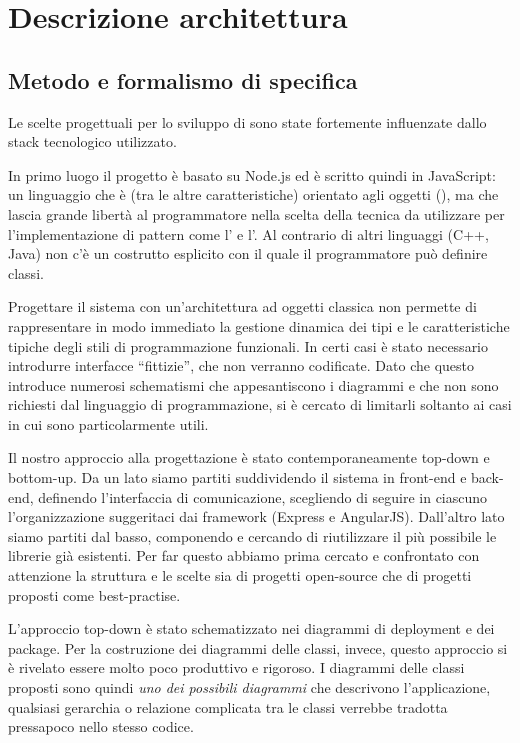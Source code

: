 \section{Descrizione architettura}

\subsection{Metodo e formalismo di specifica}

Le scelte progettuali per lo sviluppo di \ProjectName{} sono state fortemente influenzate dallo stack tecnologico utilizzato.

In primo luogo il progetto è basato su Node.js ed è scritto quindi in JavaScript: un linguaggio che è (tra le altre caratteristiche) orientato agli oggetti (), ma che lascia grande libertà al programmatore nella scelta della tecnica da utilizzare per l'implementazione di pattern come l' e l'. Al contrario di altri linguaggi (C++, Java) non c'è un costrutto esplicito con il quale il programmatore può definire classi. 

Progettare il sistema con un'architettura ad oggetti classica non permette di rappresentare in modo immediato la gestione dinamica dei tipi e le caratteristiche tipiche degli stili di programmazione funzionali. In certi casi è stato necessario introdurre interfacce ``fittizie'', che non verranno codificate. Dato che questo introduce numerosi schematismi che appesantiscono i diagrammi e che non sono richiesti dal linguaggio di programmazione, si è cercato di limitarli soltanto ai casi in cui sono particolarmente utili.

Il nostro approccio alla progettazione è stato contemporaneamente top-down e bottom-up. Da un lato siamo partiti suddividendo il sistema in front-end e back-end, definendo l'interfaccia di comunicazione, scegliendo di seguire in ciascuno l'organizzazione suggeritaci dai framework (Express e AngularJS). Dall'altro lato siamo partiti dal basso, componendo e cercando di riutilizzare il più possibile le librerie già esistenti. Per far questo abbiamo prima cercato e confrontato con attenzione la struttura e le scelte sia di progetti open-source che di progetti proposti come best-practise.

L'approccio top-down è stato schematizzato nei diagrammi di deployment e dei package. Per la costruzione dei diagrammi delle classi, invece, questo approccio si è rivelato essere molto poco produttivo e rigoroso. I diagrammi delle classi proposti sono quindi \emph{uno dei possibili diagrammi} che descrivono l'applicazione, qualsiasi gerarchia o relazione complicata tra le classi verrebbe tradotta pressapoco nello stesso codice.

